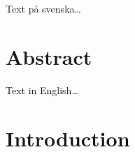 \documentclass[a4paper,11pt]{article}
\begin{document}
{Text på svenska\ldots

\newpage

\mbox{}

\newpage

\section*{Abstract}

Text in English\ldots

\newpage

\mbox{}

\newpage
\tableofcontents
\newpage
\ifodd\value{page}\else\mbox{}\newpage\fi
\setcounter{page}{1}
\renewcommand{\thepage}{\rempage}

\section{Introduction}

}
\end{document}
